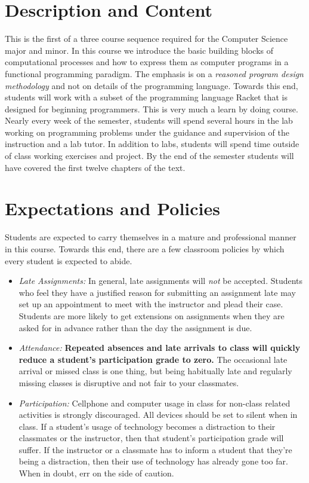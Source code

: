 \documentclass[10pt]{article}
\begin{document}
\section{Description and Content}

This is the first of a three course sequence required for the Computer Science major and minor. In this course we introduce the basic building blocks of computational processes and how to express them as computer programs in a functional programming paradigm. The emphasis is on a \textit{reasoned program design methodology} and not on details of the programming language. Towards this end, students will work with a subset of the programming language Racket that is designed for beginning programmers. This is very much a learn by doing course. Nearly every week of the semester, students will spend several hours in the lab working on programming problems under the guidance and supervision of the instruction and a lab tutor. In addition to labs, students will spend time outside of class working exercises and project. By the end of the semester students will have covered the first twelve chapters of the text.

\section{Expectations and Policies}

Students are expected to carry themselves in a mature and professional manner in this course. Towards this end, there are a few classroom policies by which every student is expected to abide.
\begin{itemize}

\item \textit{Late Assignments: } In general, late assignments will \textit{not} be accepted.  Students who feel they have a justified reason for submitting an assignment late may set up an appointment to meet with the instructor and plead their case.  Students are more likely to get extensions on assignments when they are asked for in advance rather than the day the assignment is due.

\item \textit{Attendance: } \textbf{Repeated absences and late arrivals to class will quickly reduce a student's participation grade to zero.}  The occasional late arrival or missed class is one thing, but being habitually late and regularly missing classes is disruptive and not fair to your classmates.

\item \textit{Participation: }  Cellphone and computer usage in class for non-class related activities is strongly discouraged.  All devices should be set to silent when in class.  If a student's usage of technology becomes a distraction to their classmates or the instructor, then that student's participation grade will suffer.  If the instructor or a classmate has to inform a student that they're being a distraction, then their use of technology has already gone too far.  When in doubt, err on the side of caution.

\end{itemize}
\end{document}
